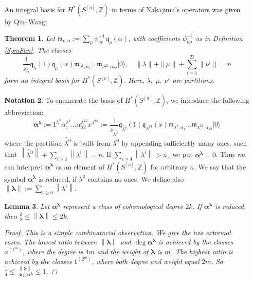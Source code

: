 \documentclass{amsart}
\newcommand{\hilb}[1]{^{[#1]}}
\newcommand{\vac}{|0\rangle}
\newcommand{\One}{1}
\newcommand{\IZ}{\mathbb{Z}}
\newcommand{\km}{\mathfrak{m}}
\newcommand{\kq}{\mathfrak{q}}
\theoremstyle{plain}
\newtheorem{theorem}{Theorem}[section]
\newtheorem{lemma}[theorem]{Lemma}
\theoremstyle{definition}
\newtheorem{notation}[theorem]{Notation}
\theoremstyle{remark}
\begin{document}
An integral basis for $H^\ast(S\hilb{n},\IZ)$ in terms of Nakajima's operators was given by Qin--Wang:
\begin{theorem} \label{QinWangTheorem}\cite[Thm. 5.4.]{QinWang} Let $\km_{\nu,\alpha} := \sum_\rho \psi_{\nu\rho}^{-1}\,\kq_{\rho}(\alpha)$, with coefficients $ \psi_{\nu\rho}^{-1}$ as in Definition \ref{SymFun}. The classes
$$ \frac{1}{z_\lambda} \kq_\lambda(1)\kq_\mu(x)\km_{\nu^1,\alpha_1}\ldots\km_{\nu^{22},\alpha_{22}}\vac,\quad \|\lambda\| +\|\mu\| + \sum_{i=1}^{22}\|\nu^i\| = n
$$ 
form an integral basis for $H^\ast(S\hilb{n},\IZ)$. Here,
$\lambda,\; \mu,\; \nu^i$ are partitions.
\end{theorem}
\begin{notation}\label{notation}
To enumerate the basis of $H^\ast(S\hilb{n},\IZ)$, we introduce the following abbreviation:
$$ \boldsymbol\alpha^{\boldsymbol\lambda} :=
\One^{\lambda^0} \alpha_1^{\lambda^1}\ldots\alpha_{22}^{\lambda^{22}}x^{\lambda^{23}} :=
\frac{1}{z_{\widetilde{\lambda^0}} }
\kq_{\widetilde{\lambda^0}}(\One)\kq_{\lambda^{23}}(x)\km_{\lambda^1,\alpha_1}\ldots\km_{\lambda^{22},\alpha_{22}}\vac
$$
where the partition $\widetilde{\lambda^0}$ is built from $\lambda^0$ by appending sufficiently many ones, such that $\left\|\widetilde{\lambda^0}\right\| +\sum_{i\geq 1}\left\|\lambda^i\right\| = n $. If $\sum_{i\geq 0}\left\|\lambda^i\right\| > n, $ we put $\boldsymbol\alpha^{\boldsymbol\lambda}=0$. Thus we can interpret $\boldsymbol\alpha^{\boldsymbol\lambda}$ as an element of $H^\ast(S\hilb{n},\IZ)$ for arbitrary $n$. We say that the symbol $\boldsymbol\alpha^{\boldsymbol\lambda}$ is reduced, if $\lambda^0$ contains no ones. We define also $\left\|\boldsymbol\lambda\right\| := \sum_{i\geq 0}\left\|\lambda^i\right\|$. 
\end{notation}
\begin{lemma}\label{degBound}
Let $\boldsymbol\alpha^{\boldsymbol\lambda}$ represent a class of cohomological degree $2k$. If $\boldsymbol\alpha^{\boldsymbol\lambda}$ is reduced, then $\frac{k}{2}\leq\left\|\boldsymbol{\lambda}\right\| \leq 2k$.
\begin{proof} This is a simple combinatorial observation. We give the two extremal cases.
The lowest ratio between $\left\|\boldsymbol{\lambda}\right\|$ and $\deg \boldsymbol\alpha^{\boldsymbol\lambda}$ is achieved by the classes $x^{(1^m)}$, where the degree is $4m$ and the weight of $\boldsymbol{\lambda}$ is $m$. The highest ratio is achieved by the classes $1^{(2^m)}$, where both degree and weight equal $2m$. So $\frac{1}{4}\leq\frac{\left\|\boldsymbol{\lambda}\right\|}{\deg \boldsymbol\alpha^{\boldsymbol\lambda}}\leq 1$.
\end{proof}
\end{lemma}
\end{document}

